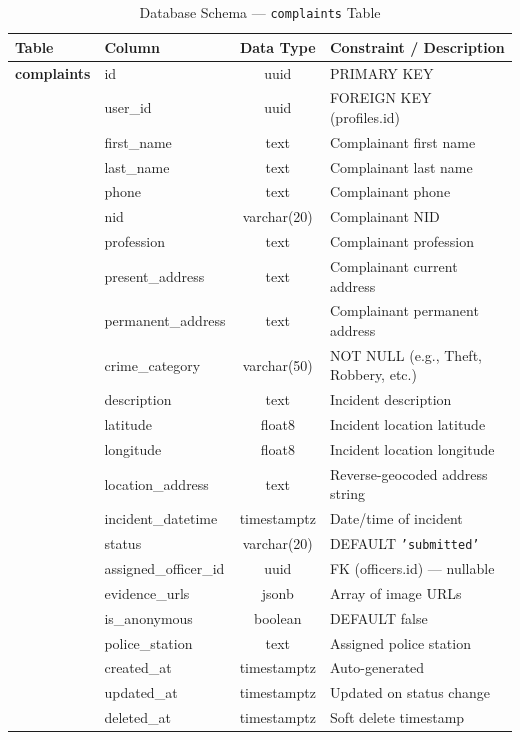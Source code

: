 \documentclass[11pt, a4paper]{report}
\begin{document}
\begin{table}[ht]
\centering
\caption{Database Schema --- \texttt{complaints} Table}
\label{tab:complaints}
\begin{tabularx}{\textwidth}{llcX}
\toprule
\textbf{Table} & \textbf{Column} & \textbf{Data Type} & \textbf{Constraint / Description} \\
\midrule
\textbf{complaints} & id & uuid & PRIMARY KEY \\
& user\_id & uuid & FOREIGN KEY (profiles.id) \\
& first\_name & text & Complainant first name \\
& last\_name & text & Complainant last name \\
& phone & text & Complainant phone \\
& nid & varchar(20) & Complainant NID \\
& profession & text & Complainant profession \\
& present\_address & text & Complainant current address \\
& permanent\_address & text & Complainant permanent address \\
& crime\_category & varchar(50) & NOT NULL (e.g., Theft, Robbery, etc.) \\
& description & text & Incident description \\
& latitude & float8 & Incident location latitude \\
& longitude & float8 & Incident location longitude \\
& location\_address & text & Reverse-geocoded address string \\
& incident\_datetime & timestamptz & Date/time of incident \\
& status & varchar(20) & DEFAULT \texttt{'submitted'} \\
& assigned\_officer\_id & uuid & FK (officers.id) --- nullable \\
& evidence\_urls & jsonb & Array of image URLs \\
& is\_anonymous & boolean & DEFAULT false \\
& police\_station & text & Assigned police station \\
& created\_at & timestamptz & Auto-generated \\
& updated\_at & timestamptz & Updated on status change \\
& deleted\_at & timestamptz & Soft delete timestamp \\
\bottomrule
\end{tabularx}
\end{table}
\end{document}
